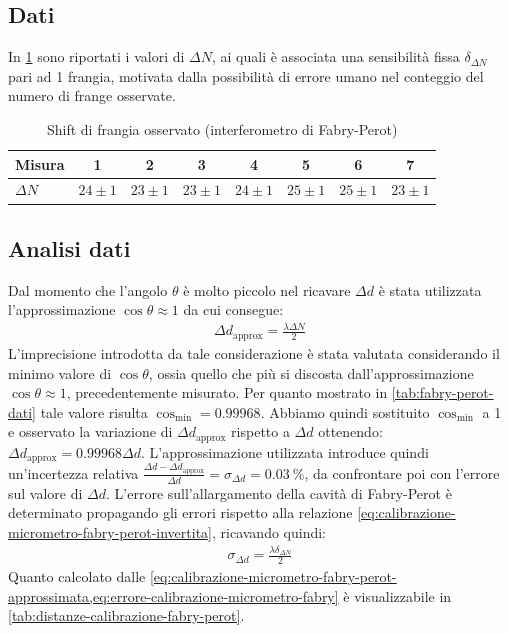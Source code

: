 \documentclass[a4paper]{article}
\begin{document}
\subsection{Dati}
In \cref{tab:micrometro-fabry-perot} sono riportati i valori di $\Delta N$, ai quali è associata una sensibilità fissa $\delta_{\Delta N}$ pari ad 1 frangia, motivata dalla possibilità di errore umano nel conteggio del numero di frange osservate.

\begin{table}[htbp]
\caption{Shift di frangia osservato (interferometro di Fabry-Perot)}
\label{tab:micrometro-fabry-perot}
\centering
\begin{tabular}{|l|ccccccc|}
\hline
Misura & 1 & 2 & 3 & 4 & 5 & 6 & 7 \\\hline\hline
$\Delta N$ & $24 \pm 1$ & $23 \pm 1$ & $23 \pm 1$ & $24 \pm 1$ & $25 \pm 1$ & $25 \pm 1$ & $23 \pm 1$ \\\hline
\end{tabular}
\end{table}

\subsection{Analisi dati}
Dal momento che l'angolo $\theta$ è molto piccolo nel ricavare $\Delta d$ è stata utilizzata l'approssimazione $\cos{\theta}\approx1$ da cui consegue:
\begin{align}
    \Delta d_{\text{approx}} = \frac{\lambda \Delta N}{2}
\label{eq:calibrazione-micrometro-fabry-perot-approssimata}
\end{align}
L'imprecisione introdotta da tale considerazione è stata valutata considerando il minimo valore di $\cos{\theta}$, ossia quello che più si discosta dall'approssimazione $\cos{\theta}\approx1$, precedentemente misurato. Per quanto mostrato in \cref{tab:fabry-perot-dati} tale valore risulta $\cos_{\text{min}}=\num{0.99968}$.
Abbiamo quindi sostituito $\cos_{\text{min}}$ a 1 e osservato la variazione di $\Delta d_{\text{approx}}$ rispetto a $\Delta d$ ottenendo: $\Delta d_{\text{approx}} = \num{0.99968} \Delta d$. L'approssimazione utilizzata introduce quindi un'incertezza relativa $\frac{\Delta d- \Delta d_{\text{approx}}}{\Delta d}=\sigma_{\Delta d}=\SI{0.03}{\percent}$, da confrontare poi con l'errore sul valore di $\Delta d$.
L'errore sull'allargamento della cavità di Fabry-Perot è determinato propagando gli errori rispetto alla relazione \ref{eq:calibrazione-micrometro-fabry-perot-invertita}, ricavando quindi:
\begin{align}
   \sigma_{\Delta d}= \frac{\lambda \delta_{\Delta N}}{2}
\label{eq:errore-calibrazione-micrometro-fabry}
\end{align}
Quanto calcolato dalle \cref{eq:calibrazione-micrometro-fabry-perot-approssimata,eq:errore-calibrazione-micrometro-fabry} è visualizzabile in \cref{tab:distanze-calibrazione-fabry-perot}.
\end{document}
